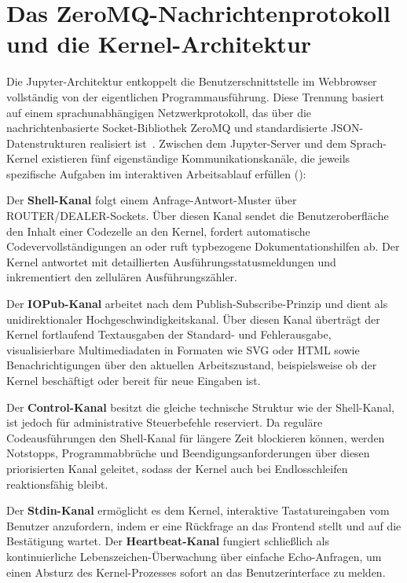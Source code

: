 \section{Das ZeroMQ-Nachrichtenprotokoll und die Kernel-Architektur}
\label{sec:kernels_protocol}

Die Jupyter-Architektur entkoppelt die Benutzerschnittstelle im Webbrowser vollständig von der eigentlichen Programmausführung.
Diese Trennung basiert auf einem sprachunabhängigen Netzwerkprotokoll, das über die nachrichtenbasierte Socket-Bibliothek ZeroMQ und standardisierte JSON-Datenstrukturen realisiert ist~\cite{hintjens2013zeromq,kluyver2016jupyter}.
Zwischen dem Jupyter-Server und dem Sprach-Kernel existieren fünf eigenständige Kommunikationskanäle, die jeweils spezifische Aufgaben im interaktiven Arbeitsablauf erfüllen ():

Der \textbf{Shell-Kanal} folgt einem Anfrage-Antwort-Muster über ROUTER/DEALER-Sockets.
Über diesen Kanal sendet die Benutzeroberfläche den Inhalt einer Codezelle an den Kernel, fordert automatische Codevervollständigungen an oder ruft typbezogene Dokumentationshilfen ab.
Der Kernel antwortet mit detaillierten Ausführungsstatusmeldungen und inkrementiert den zellulären Ausführungszähler.

Der \textbf{IOPub-Kanal} arbeitet nach dem Publish-Subscribe-Prinzip und dient als unidirektionaler Hochgeschwindigkeitskanal.
Über diesen Kanal überträgt der Kernel fortlaufend Textausgaben der Standard- und Fehlerausgabe, visualisierbare Multimediadaten in Formaten wie SVG oder HTML sowie Benachrichtigungen über den aktuellen Arbeitszustand, beispielsweise ob der Kernel beschäftigt oder bereit für neue Eingaben ist.

Der \textbf{Control-Kanal} besitzt die gleiche technische Struktur wie der Shell-Kanal, ist jedoch für administrative Steuerbefehle reserviert.
Da reguläre Codeausführungen den Shell-Kanal für längere Zeit blockieren können, werden Notstopps, Programmabbrüche und Beendigungsanforderungen über diesen priorisierten Kanal geleitet, sodass der Kernel auch bei Endlosschleifen reaktionsfähig bleibt.

Der \textbf{Stdin-Kanal} ermöglicht es dem Kernel, interaktive Tastatureingaben vom Benutzer anzufordern, indem er eine Rückfrage an das Frontend stellt und auf die Bestätigung wartet.
Der \textbf{Heartbeat-Kanal} fungiert schließlich als kontinuierliche Lebenszeichen-Überwachung über einfache Echo-Anfragen, um einen Absturz des Kernel-Prozesses sofort an das Benutzerinterface zu melden.

